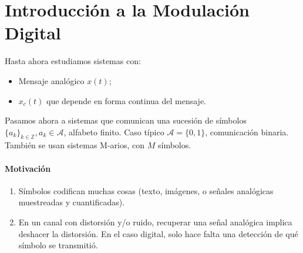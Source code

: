 \section{Introducción a la Modulación Digital}

Hasta ahora estudiamos sistemas con:
\begin{itemize}
    \item Mensaje analógico $x(t)$;
    \item $x_c(t)$ que depende en forma continua del mensaje.
\end{itemize}

Pasamos ahora a sistemas que comunican una sucesión de símbolos
$\{a_k\}_{k\in\mathbb{Z}}, a_k\in \mathcal{A}$, alfabeto finito.
Caso típico $\mathcal{A}=\{0,1\}$, comunicación binaria. También
se usan sistemas M-arios, con $M$ símbolos.

\paragraph{Motivación}
\begin{enumerate}
    \item Símbolos codifican muchas cosas (texto, imágenes, o señales analógicas muestreadas y cuantificadas).
    \item En un canal con distorsión y/o ruido, recuperar una señal analógica implica deshacer la distorsión. En el caso digital, solo hace falta una detección de qué símbolo se transmitió.
\end{enumerate}



